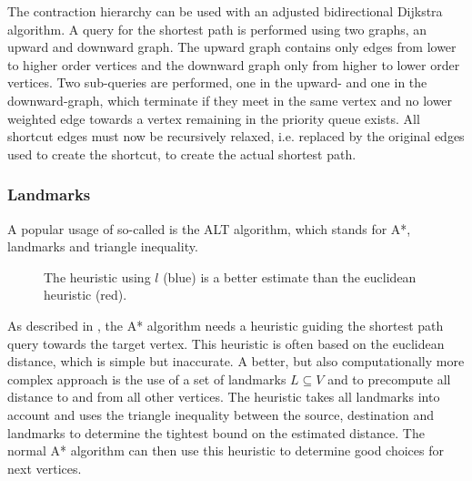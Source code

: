 			The contraction hierarchy can be used with an adjusted bidirectional Dijkstra algorithm\cite[29-30]{geisberger-contraction-hierarchies}.
			A query for the shortest path is performed using two graphs, an upward and downward graph.
			The upward graph contains only edges from lower to higher order vertices and the downward graph only from higher to lower order vertices.
			Two sub-queries are performed, one in the upward- and one in the downward-graph, which terminate if they meet in the same vertex and no lower weighted edge towards a vertex remaining in the priority queue exists.
			All shortcut edges must now be recursively relaxed, i.e. replaced by the original edges used to create the shortcut, to create the actual shortest path.
		
		\subsubsection{Landmarks}
		\label{subsubsec:landmarks}
		
			A popular usage of so-called  is the ALT algorithm, which stands for A*, landmarks and triangle inequality\cite{goldberg-landmarks}.
			
			\begin{figure}
				\vspace{-1\baselineskip}
				\begin{figcenter}
				\end{figcenter}
				\caption{The heuristic using $l$ (blue) is a better estimate than the euclidean heuristic (red).}
			\end{figure}
			
			As described in , the A* algorithm needs a heuristic guiding the shortest path query towards the target vertex.
			This heuristic is often based on the euclidean distance, which is simple but inaccurate.
			A better, but also computationally more complex approach is the use of a set of landmarks $L \subseteq V$ and to precompute all distance to and from all other vertices.
			The heuristic takes all landmarks into account and uses the triangle inequality between the source, destination and landmarks to determine the tightest bound on the estimated distance.
			The normal A* algorithm can then use this heuristic to determine good choices for next vertices.
		
